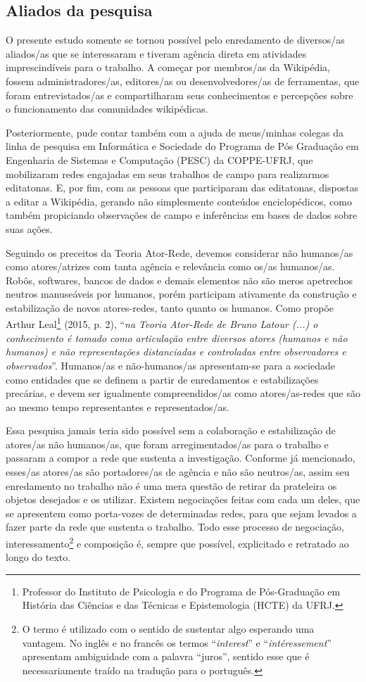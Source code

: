 \subsection{Aliados da pesquisa}

O presente estudo somente se tornou possível pelo enredamento de diversos/as aliados/as que se interessaram e tiveram agência direta em atividades imprescindíveis para o trabalho. A começar por membros/as da Wikipédia, fossem administradores/as, editores/as ou desenvolvedores/as de ferramentas, que foram entrevistados/as e compartilharam seus conhecimentos e percepções sobre o funcionamento das comunidades wikipédicas.

Posteriormente, pude contar também com a ajuda de meus/minhas colegas da linha de pesquisa em Informática e Sociedade do Programa de Pós Graduação em Engenharia de Sistemas e Computação (PESC) da COPPE-UFRJ, que mobilizaram redes engajadas em seus trabalhos de campo para realizarmos editatonas. E, por fim, com as pessoas que participaram das editatonas, dispostas a editar a Wikipédia, gerando não simplesmente conteúdos enciclopédicos, como também propiciando observações de campo e inferências em bases de dados sobre suas ações.

Seguindo os preceitos da Teoria Ator-Rede, devemos considerar não humanos/as como atores/atrizes com tanta agência e relevância como os/as humanos/as. Robôs, softwares, bancos de dados e demais elementos não são meros apetrechos neutros manuseáveis por humanos, porém participam ativamente da construção e estabilização de novos atores-redes, tanto quanto os humanos. Como propõe Arthur Leal\footnote{Professor do Instituto de Psicologia e do Programa de Pós-Graduação em História das Ciências e das Técnicas e Epistemologia (HCTE) da UFRJ.} (2015, p. 2), ``\textit{na Teoria Ator-Rede de Bruno Latour (...) o conhecimento é tomado como articulação entre diversos atores (humanos e não humanos) e não representações distanciadas e controladas entre observadores e observados}''. Humanos/as e não-humanos/as apresentam-se para a sociedade como entidades que se definem a partir de enredamentos e estabilizações precárias, e devem ser igualmente compreendidos/as como atores/as-redes que são ao mesmo tempo representantes e representados/as.

Essa pesquisa jamais teria sido possível sem a colaboração e estabilização de atores/as não humanos/as, que foram arregimentados/as para o trabalho e passaram a compor a rede que sustenta a investigação. Conforme já mencionado, esses/as atores/as são portadores/as de agência e não são neutros/as, assim seu enredamento no trabalho não é uma mera questão de retirar da prateleira os objetos desejados e os utilizar. Existem negociações feitas com cada um deles, que se apresentem como porta-vozes de determinadas redes, para que sejam levados a fazer parte da rede que sustenta o trabalho. Todo esse processo de negociação, interessamento\footnote{O termo é utilizado com o sentido de sustentar algo esperando uma vantagem. No inglês e no francês os termos “\textit{interest}” e “\textit{intéressement}” apresentam ambiguidade com a palavra “juros”, sentido esse que é necessariamente traído na tradução para o português.} e composição é, sempre que possível, explicitado e retratado ao longo do texto.

